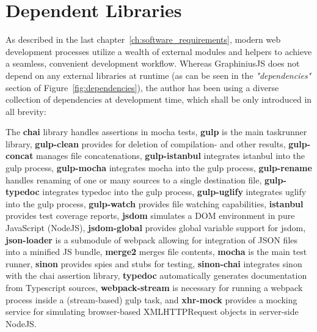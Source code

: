 \section{Dependent Libraries}
\label{sect:dep_libraries}

	As described in the last chapter~\ref{ch:software_requirements}, modern web development processes utilize a wealth of external modules and helpers to achieve a seamless, convenient development workflow. Whereas GraphiniusJS does not depend on any external libraries at runtime (as can be seen in the \textit{"dependencies"} section of Figure~\ref{fig:dependencies}), the author has been using a diverse collection of dependencies at development time, which shall be only introduced in all brevity:
	
	The \textbf{chai} library handles assertions in mocha tests, \textbf{gulp} is the main taskrunner library, \textbf{gulp-clean} provides for deletion of compilation- and other results, \textbf{gulp-concat} manages file concatenations, \textbf{gulp-istanbul} integrates istanbul into the gulp process, \textbf{gulp-mocha} integrates mocha into the gulp process, \textbf{gulp-rename} handles renaming of one or many sources to a single destination file, \textbf{gulp-typedoc} integrates typedoc into the gulp process, \textbf{gulp-uglify} integrates uglify into the gulp process, \textbf{gulp-watch} provides file watching capabilities, \textbf{istanbul} provides test coverage reports, \textbf{jsdom} simulates a DOM environment in pure JavaScript (NodeJS), \textbf{jsdom-global} provides global variable support for jsdom, \textbf{json-loader} is a submodule of webpack allowing for integration of JSON files into a minified JS bundle, \textbf{merge2} merges file contents, \textbf{mocha} is the main test runner, \textbf{sinon} provides spies and stubs for testing, \textbf{sinon-chai} integrates sinon with the chai assertion library, \textbf{typedoc} automatically generates documentation from Typescript sources, \textbf{webpack-stream} is necessary for running a webpack process inside a (stream-based) gulp task, and \textbf{xhr-mock} provides a mocking service for simulating browser-based XMLHTTPRequest objects in server-side NodeJS.

